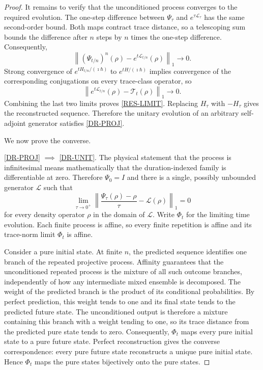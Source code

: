 \documentclass{techbrief}
\begin{document}
\begin{proof}
	It remains to verify that the unconditioned process converges to the required evolution. The one-step difference between $\Psi_\tau$ and $e^{\tau\mathcal{L}_\tau}$ has the same second-order bound. Both maps contract trace distance, so a telescoping sum bounds the difference after $n$ steps by $n$ times the one-step difference. Consequently,
	\begin{equation}
		\left\|\left(\Psi_{t/n}\right)^n(\rho)-e^{t\mathcal{L}_{t/n}}(\rho)\right\|_1\longrightarrow0.
	\end{equation}
	Strong convergence of $e^{tH_{t/n}/(\imath\hbar)}$ to $e^{tH/(\imath\hbar)}$ implies convergence of the corresponding conjugations on every trace-class operator, so
	\begin{equation}
		\left\|e^{t\mathcal{L}_{t/n}}(\rho)-\mathcal{T}_t(\rho)\right\|_1\longrightarrow0.
	\end{equation}
	Combining the last two limits proves \ref{RES-LIMIT}. Replacing $H_\tau$ with $-H_\tau$ gives the reconstructed sequence. Therefore the unitary evolution of an arbitrary self-adjoint generator satisfies \ref{DR-PROJ}.

	We now prove the converse.

	\ref{DR-PROJ} $\implies$ \ref{DR-UNIT}. The physical statement that the process is infinitesimal means mathematically that the duration-indexed family is differentiable at zero. Therefore $\Psi_0=I$ and there is a single, possibly unbounded generator $\mathcal{L}$ such that
	\begin{equation}
		\lim_{\tau\to0^+}\left\|\frac{\Psi_\tau(\rho)-\rho}{\tau}-\mathcal{L}(\rho)\right\|_1=0
	\end{equation}
	for every density operator $\rho$ in the domain of $\mathcal{L}$. Write $\Phi_t$ for the limiting time evolution. Each finite process is affine, so every finite repetition is affine and its trace-norm limit $\Phi_t$ is affine.

	Consider a pure initial state. At finite $n$, the predicted sequence identifies one branch of the repeated projective process. Affinity guarantees that the unconditioned repeated process is the mixture of all such outcome branches, independently of how any intermediate mixed ensemble is decomposed. The weight of the predicted branch is the product of its conditional probabilities. By perfect prediction, this weight tends to one and its final state tends to the predicted future state. The unconditioned output is therefore a mixture containing this branch with a weight tending to one, so its trace distance from the predicted pure state tends to zero. Consequently, $\Phi_t$ maps every pure initial state to a pure future state. Perfect reconstruction gives the converse correspondence: every pure future state reconstructs a unique pure initial state. Hence $\Phi_t$ maps the pure states bijectively onto the pure states.


\end{proof}
\end{document}
